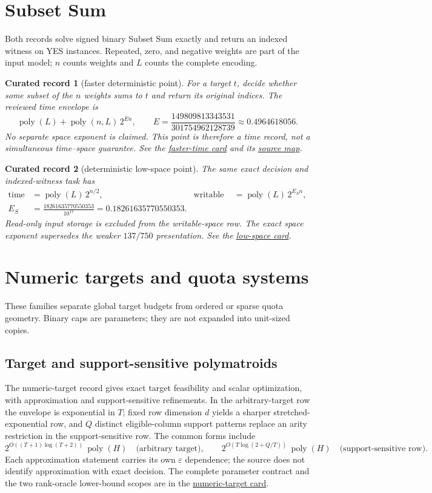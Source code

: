 \documentclass[10pt,a4paper]{article}
\newcommand{\repo}[2]{\href{https://github.com/icekylinx/algorithm-frontier/#1}{#2}}
\newcommand{\poly}{\operatorname{poly}}
\newcommand{\eps}{\varepsilon}
\theoremstyle{recordstyle}
\newtheorem*{record}{Curated record}
\begin{document}
\section{Subset Sum}
Both records solve signed binary Subset Sum exactly and return an indexed
witness on YES instances.  Repeated, zero, and negative weights are part of the
input model; $n$ counts weights and $L$ counts the complete encoding.

\begin{record}[faster deterministic point]
For a target $t$, decide whether some subset of the $n$ weights sums to $t$ and
return its original indices.  The reviewed time envelope is
\[
  \poly(L) + \poly(n,L)\,2^{En}, \qquad
  E=\frac{149809813343531}{301754962128739}
    \approx 0.4964618056.
\]
No separate space exponent is claimed.  This point is therefore a time record,
not a simultaneous time--space guarantee.  See the
\repo{problems/subset-sum-fast-deterministic/}{faster-time card} and its
\repo{sources/subset-sum/}{source map}.
\end{record}

\begin{record}[deterministic low-space point]
The same exact decision and indexed-witness task has
\[
  \begin{aligned}
    \text{time}&=\poly(L)\,2^{n/2}, &
    \text{writable space}&=\poly(L)\,2^{E_Sn},\\[-0.15em]
    E_S&=\frac{18261635770550353}{10^{17}}
      =0.18261635770550353.
  \end{aligned}
\]
Read-only input storage is excluded from the writable-space row.  The exact
space exponent supersedes the weaker $137/750$ presentation.  See the
\repo{problems/subset-sum-low-space-deterministic/}{low-space card}.
\end{record}

\section{Numeric targets and quota systems}
These families separate global target budgets from ordered or sparse quota
geometry.  Binary caps are parameters; they are not expanded into unit-sized
copies.

\subsection{Target and support-sensitive polymatroids}
The numeric-target record gives exact target feasibility and scalar optimization,
with approximation and support-sensitive refinements.  In the arbitrary-target
row the envelope is exponential in $T$; fixed row dimension $d$ yields a sharper
stretched-exponential row, and $Q$ distinct eligible-column support patterns
replace an arity restriction in the support-sensitive row.  The common forms
include
\[
  2^{O((T+1)\log(T+2))}\,\poly(H) \quad\text{(arbitrary target)},
  \qquad
  2^{O(T\log(2+Q/T))}\,\poly(H) \quad\text{(support-sensitive row)}.
\]
Each approximation statement carries its own $\eps$ dependence; the source
does not identify approximation with exact decision.  The complete parameter
contract and the two rank-oracle lower-bound scopes are in the
\repo{problems/numeric-target-frontier/}{numeric-target card}.
\end{document}
